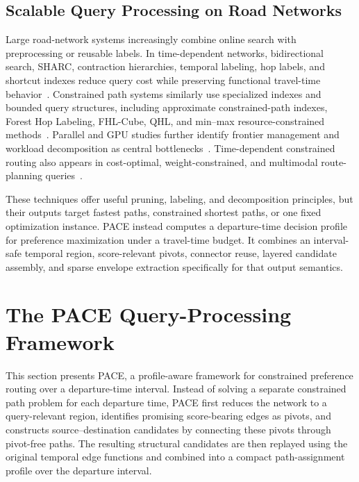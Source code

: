 \documentclass[a4paper,fleqn]{cas-dc}
\begin{document}
\subsection{Scalable Query Processing on Road Networks}
\label{subsec:rw_scalable_query_processing}

Large road-network systems increasingly combine online search with preprocessing or reusable labels. In time-dependent networks, bidirectional search, SHARC, contraction hierarchies, temporal labeling, hop labels, and shortcut indexes reduce query cost while preserving functional travel-time behavior~\cite{NanniciniDellingLibertiSchultes2008,time-shark08,BatzGeisbergerSandersVetter2009TDCH,tdsp-index2,tdhl-fifo,tdsp-2019vldb,tdsp-icde24}. Constrained path systems similarly use specialized indexes and bounded query structures, including approximate constrained-path indexes, Forest Hop Labeling, FHL-Cube, QHL, and min--max resource-constrained methods~\cite{wang2016cola,liu2021foresthop,liu2022fhlcube,wang2023qhl,qian2025minmax}. Parallel and GPU studies further identify frontier management and workload decomposition as central bottlenecks~\cite{dutta2022multithreading,lu2020gpu}. Time-dependent constrained routing also appears in cost-optimal, weight-constrained, and multimodal route-planning queries~\cite{tdsp-2014vldb,YuanLianWangChenMaWang2019,yuan2019tdcsp,WangYuanWangZhouMuWang2021}.

These techniques offer useful pruning, labeling, and decomposition principles, but their outputs target fastest paths, constrained shortest paths, or one fixed optimization instance. PACE instead computes a departure-time decision profile for preference maximization under a travel-time budget. It combines an interval-safe temporal region, score-relevant pivots, connector reuse, layered candidate assembly, and sparse envelope extraction specifically for that output semantics.
\section{The PACE Query-Processing Framework}
\label{sec:pace}

This section presents PACE, a profile-aware framework for constrained
preference routing over a departure-time interval. Instead of solving a
separate constrained path problem for each departure time, PACE first reduces
the network to a query-relevant region, identifies promising score-bearing
edges as pivots, and constructs source--destination candidates by connecting
these pivots through pivot-free paths. The resulting structural candidates are
then replayed using the original temporal edge functions and combined into a
compact path-assignment profile over the departure interval.
\end{document}
